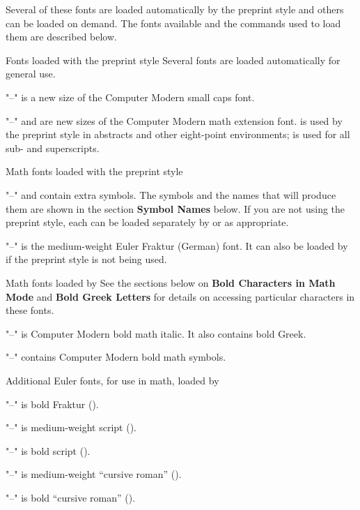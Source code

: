 Several of these fonts are loaded automatically by the preprint
style and others can be loaded on demand.  The fonts available and the
commands used to load them are described below.

\subsubhead Fonts loaded with the preprint style
\endsubsubhead
Several fonts are loaded automatically for general use.
\roster
\item"--"  is a new size of the Computer Modern small caps font.
\item"--"  and  are new sizes of the Computer
        Modern math extension font.   is used by the preprint
        style in abstracts and other eight-point environments; 
        is used for all sub- and superscripts.
\endroster


\subsubhead Math fonts loaded with the preprint style
\endsubsubhead
\roster
\item"--"  and  contain extra symbols.  The symbols
        and the names that will produce them are shown in the section 
        {\bf Symbol Names} below.  If you are not using the preprint style,
        each can be loaded separately by  or 
        as appropriate.
\item"--"  is the medium-weight Euler Fraktur (German) font.
        It can also be loaded by  if the preprint style is not
        being used.
\endroster


\subsubhead Math fonts loaded by 
\endsubsubhead
See the sections below on {\bf Bold Characters in Math Mode} and
{\bf Bold Greek Letters} for details on accessing particular characters
in these fonts.
\roster
\item"--"  is Computer Modern bold math italic.
        It also contains bold Greek.
\item"--"  contains Computer Modern bold math symbols.
\endroster


\subsubhead Additional Euler fonts, for use in math, loaded by
\tt\endsubsubhead
\roster
\item"--"  is bold Fraktur ().
\item"--"  is medium-weight script ().
\item"--"  is bold script ().
\item"--"  is medium-weight ``cursive roman'' ().
\item"--"  is bold ``cursive roman'' ().
\endroster


